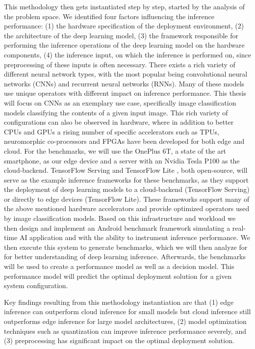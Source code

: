 This methodology then gets instantiated step by step, started by the analysis of the problem space.
We identified four factors influencing the inference performance: (1) the hardware specification of the deployment environment, (2) the architecture of the deep learning model, (3) the framework responsible for performing the inference operations of the deep learning model on the hardware components, (4) the inference input, on which the inference is performed on, since preprocessing of these inputs is often necessary.
There exists a rich variety of different neural network types, with the most popular being convolutional neural networks (CNNs) and recurrent neural networks (RNNs).
Many of these models use unique operators with different impact on inference performance.
This thesis will focus on CNNs as an exemplary use case, specifically image classification models classifying the contents of a given input image.
This rich variety of configurations can also be observed in hardware, where in addition to better CPUs and GPUs a rising number of specific accelerators such as TPUs, neuromorphic co-processors and FPGAs have been developed for both edge and cloud.
For the benchmarks, we will use the OnePlus 6T, a state of the art smartphone, as our edge device and a server with an Nvidia Tesla P100 as the cloud-backend.
TensorFlow Serving \cite{tfServing} and TensorFlow Lite \cite{tfLite}, both open-source, will serve as the example inference frameworks for these benchmarks, as they support the deployment of deep learning models to a cloud-backend (TensorFlow Serving) or directly to edge devices (TensorFlow Lite). These frameworks support many of the above mentioned hardware accelerators and provide optimized operators used by image classification models.
Based on this infrastructure and workload we then design and implement an Android benchmark framework simulating a real-time AI application and  with the ability to instrument inference performance.
We then execute this system to generate benchmarks, which we will then analyze for for better understanding of deep learning inference. Afterwards, the benchmarks will be used to create a performance model as well as a decision model.
This performance model will predict the optimal deployment solution for a given system configuration.

Key findings resulting from this methodology instantiation are that (1) edge inference can outperform cloud inference for small models but cloud inference still outperforms edge inference for large model architectures, (2) model optimization techniques such as quantization can improve inference performance severely, and (3) preprocessing has significant impact on the optimal deployment solution.

